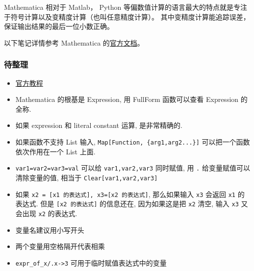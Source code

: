 

Mathematica 相对于 Matlab， Python 等偏数值计算的语言最大的特点就是专注于符号计算以及变精度计算（也叫任意精度计算）。 其中变精度计算能追踪误差， 保证输出结果的最后一位小数正确。

以下笔记详情参考 Mathematica 的\href{https://reference.wolfram.com/language/}{官方文档}。

\subsubsection{待整理}
\begin{itemize}
\item \href{https://www.wolfram.com/learningcenter/tutorialcollection/}{官方教程}
\item Mathematica 的根基是 Expression, 用 FullForm 函数可以查看 Expression 的全称.
\item 如果 expression 和 literal constant 运算, 是非常精确的.
\item 如果函数不支持 List 输入, \verb`Map[Function, {arg1,arg2...}]` 可以把一个函数依次作用在一个 List 上面.
\item \verb`var1=var2=var3=val` 可以给 \verb`var1,var2,var3` 同时赋值, 用 \verb`.` 给变量赋值可以清除变量的值, 相当于 \verb`Clear[var1,var2,var3]`
\item 如果 \verb`x2 = [x1 的表达式], x3=[x2 的表达式]`, 那么如果输入 \verb`x3` 会返回 \verb`x1` 的表达式. 但是 \verb`[x2 的表达式]` 的信息还在, 因为如果这是把 \verb`x2` 清空, 输入 \verb`x3` 又会出现 \verb`x2` 的表达式.
\item 变量名建议用小写开头
\item 两个变量用空格隔开代表相乘
\item \verb`expr_of_x/.x->3` 可用于临时赋值表达式中的变量
\end{itemize}


